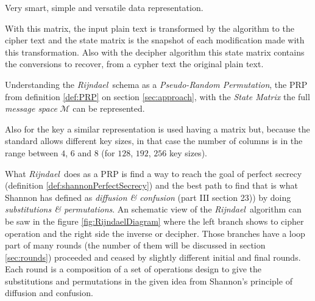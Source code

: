 \documentclass[10pt,a4paper,twoside]{llncs}
\newcommand{\rijndael}{\emph{Rijndael}}
\begin{document}
Very smart, simple and versatile data representation.

With this matrix, the input plain text is transformed by the algorithm to the cipher text and the state matrix is the snapshot of each modification made with this transformation. Also with the decipher algorithm this state matrix contains the conversions to recover, from a cypher text the original plain text.

Understanding the \rijndael\, schema as a \emph{Pseudo-Random Permutation}, the PRP from definition \ref{def:PRP} on section \ref{sec:approach}, with the \emph{State Matrix} the full \emph{message space} $\mathcal{M}$ can be represented.

Also for the key a similar representation is used having a matrix but, because the standard allows different key sizes, in that case the number of columns is in the range between $4$, $6$ and $8$ (for $128$, $192$, $256$ key sizes).

What \rijndael\, does as a PRP is find a way to reach the goal of perfect secrecy (definition \ref{def:shannonPerfectSecrecy}) and the best path to find that is what Shannon has defined as \emph{diffusion \& confusion} \cite{shannon-comTheorySecSys} (part III section 23)) by doing \emph{substitutions \& permutations}. An schematic view of the \rijndael\, algorithm can be saw in the figure \ref{fig:RijndaelDiagram} where the left branch shows to cipher operation and the right side the inverse or decipher. Those branches have a loop part of many rounds (the number of them will be discussed in section \ref{sec:rounds}) proceeded and ceased by slightly different initial and final rounds. Each round is a composition of a set of operations design to give the substitutions and permutations in the given idea from Shannon's principle of diffusion and confusion.
\end{document}
